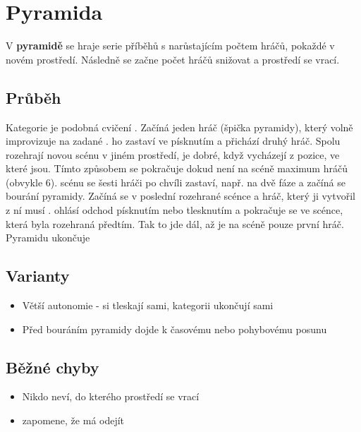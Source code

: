 
 
 
 
 
 
 
 
\needspace{5cm} \section{Pyramida} \label{pyramida}  
 
V \textbf{pyramidě}{} se hraje serie příběhů s narůstajícím počtem hráčů, pokaždé v novém prostředí. Následně se začne počet hráčů snižovat a prostředí se vrací. 
 
 
\subsection{ Průběh } Kategorie je podobná cvičení . Začíná jeden hráč (špička pyramidy), který volně improvizuje na zadané .  ho zastaví ve  písknutím a přichází druhý hráč. Spolu rozehrají novou scénu v jiném prostředí, je dobré, když vycházejí z pozice, ve které jsou. Tímto způsobem se pokračuje dokud není na scéně maximum hráčů (obvykle 6). 
 scénu se šesti hráči po chvíli zastaví,  např. na dvě fáze   a začíná se bourání pyramidy. Začíná se v poslední rozehrané scénce a hráč, který ji vytvořil z ní musí .  ohlásí odchod písknutím nebo tlesknutím a pokračuje se ve scénce, která byla rozehraná předtím. Tak to jde dál, až je na scéně pouze první hráč. Pyramidu ukončuje  
 
\subsection{ Varianty } \begin{itemize}
\item Větší autonomie -  si tleskají sami, kategorii ukončují sami
\item Před bouráním pyramidy dojde k časovému nebo pohybovému posunu
\end{itemize}
 
\subsection{ Běžné chyby } \begin{itemize}
\item Nikdo neví, do kterého prostředí se vrací
\item {} zapomene, že má odejít
\end{itemize}
 
